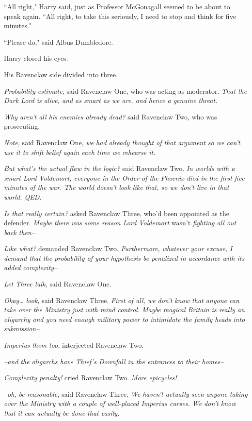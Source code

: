 ``All right," Harry said, just as Professor McGonagall seemed to be about to speak again. ``All right, to take this seriously, I need to stop and think for five minutes."

``Please do," said Albus Dumbledore.

Harry closed his eyes.

His Ravenclaw side divided into three.

\emph{Probability estimate,} said Ravenclaw One, who was acting as moderator. \emph{That the Dark Lord is alive, and as smart as we are, and hence a genuine threat.}

\emph{Why aren't all his enemies already dead?} said Ravenclaw Two, who was prosecuting.

\emph{Note,} said Ravenclaw One, \emph{we had already thought of that argument so we can't use it to shift belief \emph{again} each time we rehearse it.}

\emph{But what's the actual flaw in the logic?} said Ravenclaw Two. \emph{In worlds with a smart Lord Voldemort, everyone in the Order of the Phoenix died in the first five minutes of the war. The world doesn't look like that, so we don't live in that world. QED.}

\emph{Is that really certain?} asked Ravenclaw Three, who'd been appointed as the defender. \emph{Maybe there was some reason Lord Voldemort} wasn't \emph{fighting all out back then\---}

\emph{Like what?} demanded Ravenclaw Two. \emph{Furthermore, whatever your excuse, I demand that the probability of your hypothesis be penalized in accordance with its added complexity\---}

\emph{Let Three talk,} said Ravenclaw One.

\emph{Okay{\ldots} look,} said Ravenclaw Three. \emph{First of all, we don't \emph{know} that anyone can take over the Ministry just with mind control. Maybe magical Britain is really an oligarchy and you need enough military power to intimidate the family heads into submission\---}

\emph{Imperius them too,} interjected Ravenclaw Two.

\emph{\---and the oligarchs have Thief's Downfall in the entrances to \emph{their} homes\---}

\emph{Complexity penalty!} cried Ravenclaw Two. \emph{More epicycles!}

\---\emph{oh, be reasonable,} said Ravenclaw Three. \emph{We haven't actually \emph{seen} anyone taking over the Ministry with a couple of well-placed Imperius curses. We don't \emph{know} that it can actually be done that easily.}

